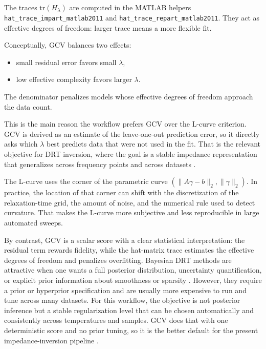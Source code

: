 \documentclass[11pt]{article}
\begin{document}
The traces $\mathrm{tr}(H_\lambda)$ are computed in the MATLAB helpers \texttt{hat\_trace\_impart\_matlab2011} and \texttt{hat\_trace\_repart\_matlab2011}. They act as effective degrees of freedom: larger trace means a more flexible fit.

Conceptually, GCV balances two effects:

\begin{itemize}
\item small residual error favors small $\lambda$,
\item low effective complexity favors larger $\lambda$.
\end{itemize}

The denominator penalizes models whose effective degrees of freedom approach the data count.

This is the main reason the workflow prefers GCV over the L-curve criterion. GCV is derived as an estimate of the leave-one-out prediction error, so it directly asks which $\lambda$ best predicts data that were not used in the fit. That is the relevant objective for DRT inversion, where the goal is a stable impedance representation that generalizes across frequency points and across datasets \cite{golub79,schluter2019,maradesa2023}.

The L-curve uses the corner of the parametric curve $(\|A\gamma-b\|_2,\|\gamma\|_2)$. In practice, the location of that corner can shift with the discretization of the relaxation-time grid, the amount of noise, and the numerical rule used to detect curvature. That makes the L-curve more subjective and less reproducible in large automated sweeps.

By contrast, GCV is a scalar score with a clear statistical interpretation: the residual term rewards fidelity, while the hat-matrix trace estimates the effective degrees of freedom and penalizes overfitting. Bayesian DRT methods are attractive when one wants a full posterior distribution, uncertainty quantification, or explicit prior information about smoothness or sparsity \cite{ciucci2015,carbone2025}. However, they require a prior or hyperprior specification and are usually more expensive to run and tune across many datasets. For this workflow, the objective is not posterior inference but a stable regularization level that can be chosen automatically and consistently across temperatures and samples. GCV does that with one deterministic score and no prior tuning, so it is the better default for the present impedance-inversion pipeline \cite{golub79,hansen93,ciucci2015,schluter2019,danzer2019,maradesa2023,carbone2025}.
\end{document}
